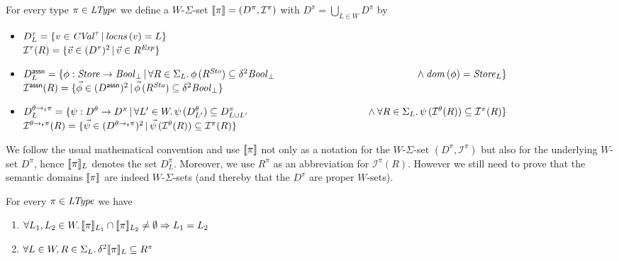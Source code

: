 \documentclass[12pt,a4paper]{report}
\newcommand{\CVal}{\nstyle{CVal}}
\newcommand{\Sto}{\nstyle{Sto}}
\newcommand{\I}{\mathcal{I}}
\begin{document}
\begin{definition}
  For every type $\pi\in\mathit{LType}$ we define a $W$-$\Sigma$-set $\semantic{\pi}=(D^\pi,\I^\pi)$
  with $D^\pi = \bigcup_{L \in W} D^\pi$ by
  \begin{itemize}
    \item $D^\tau_L = \{v\in\CVal^\tau\,|\,\locns{v} = L\}$ \\
          $\I^\tau(R) = \{\vec{v} \in (D^\tau)^2\,|\,\vec{v} \in R^\Exp\}$

    \item $D^\tassn_L = \{ \phi:\Store\to\Bool_\bot\,|\,
                           \forall R \in \Sigma_L.\,\phi\,(R^\Sto) \subseteq \delta^2\Bool_\bot \\
                           \hspace*{5cm} \wedge \dom{\phi}=\Store_L \}$ \\
          $\I^\tassn(R) = \{ \vec{\phi} \in (D^\tassn)^2\,|\,
                             \vec{\phi}\,(R^\Sto) \subseteq \delta^2 \Bool_\bot \}$

    \item $D^{\ttarrow{\theta}{\pi}}_L = \{ \psi: D^\theta \to D^\pi\,|\,
                              \forall L'\in W.\,\psi\,(D^\theta_{L'}) \subseteq D^\pi_{L \cup L'} \\
                              \hspace*{4.2cm} \wedge \forall R\in \Sigma_L.\,\psi\,(\I^\theta(R))\subseteq\I^\pi(R)\}$ \\
          $\I^{\ttarrow{\theta}{\pi}}(R) = \{ \vec{\psi} \in (D^{\ttarrow{\theta}{\pi}})^2\,|\,
                                              \vec{\psi}\,(\I^\theta(R)) \subseteq \I^\pi(R) \}$
  \end{itemize}
\end{definition}

We follow the usual mathematical convention and use $\llbracket\pi\rrbracket$ not only as a notation
for the $W$-$\Sigma$-set $(D^\pi,\I^\pi)$ but also for the underlying $W$-set $D^\pi$,
hence $\llbracket\pi\rrbracket_L$ denotes the set $D^\pi_L$. Moreover, we use $R^\pi$ as an abbreviation
for $\I^\pi(R)$. However we still need to prove that the semantic domains $\llbracket\pi\rrbracket$
are indeed $W$-$\Sigma$-sets (and thereby that the $D^\pi$ are proper $W$-sets).

\begin{lemma}
  For every $\pi \in \mathit{LType}$ we have
  \begin{enumerate}
    \item $\forall L_1,L_2 \in W.\, \llbracket\pi\rrbracket_{L_1} \cap \llbracket\pi\rrbracket_{L_2} \ne \emptyset \Rightarrow L_1=L_2$
    \item $\forall L \in W, R \in \Sigma_L.\, \delta^2 \llbracket\pi\rrbracket_L \subseteq R^\pi$
  \end{enumerate}
\end{lemma}
\end{document}
